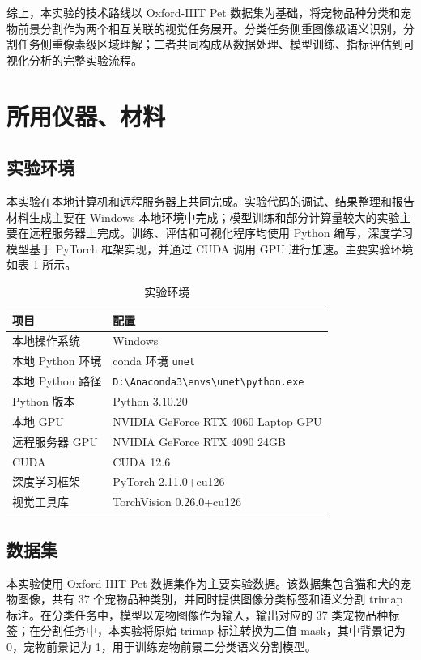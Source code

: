 \documentclass[UTF8,a4paper,12pt]{ctexart}
\begin{document}
综上，本实验的技术路线以 Oxford-IIIT Pet 数据集为基础，将宠物品种分类和宠物前景分割作为两个相互关联的视觉任务展开。分类任务侧重图像级语义识别，分割任务侧重像素级区域理解；二者共同构成从数据处理、模型训练、指标评估到可视化分析的完整实验流程。

\section{所用仪器、材料}

\subsection{实验环境}

本实验在本地计算机和远程服务器上共同完成。实验代码的调试、结果整理和报告材料生成主要在 Windows 本地环境中完成；模型训练和部分计算量较大的实验主要在远程服务器上完成。训练、评估和可视化程序均使用 Python 编写，深度学习模型基于 PyTorch 框架实现，并通过 CUDA 调用 GPU 进行加速。主要实验环境如表 \ref{tab:environment} 所示。

\begin{table}[H]
\centering
\caption{实验环境}
\label{tab:environment}
\begin{tabular}{p{}p{}}
\toprule
项目 & 配置 \\
\midrule
本地操作系统 & Windows \\
本地 Python 环境 & conda 环境 \texttt{unet} \\
本地 Python 路径 & \texttt{D:\textbackslash Anaconda3\textbackslash envs\textbackslash unet\textbackslash python.exe} \\
Python 版本 & Python 3.10.20 \\
本地 GPU & NVIDIA GeForce RTX 4060 Laptop GPU \\
远程服务器 GPU & NVIDIA GeForce RTX 4090 24GB \\
CUDA & CUDA 12.6 \\
深度学习框架 & PyTorch 2.11.0+cu126 \\
视觉工具库 & TorchVision 0.26.0+cu126 \\
\bottomrule
\end{tabular}
\end{table}

\subsection{数据集}

本实验使用 Oxford-IIIT Pet 数据集作为主要实验数据。该数据集包含猫和犬的宠物图像，共有 37 个宠物品种类别，并同时提供图像分类标签和语义分割 trimap 标注。在分类任务中，模型以宠物图像作为输入，输出对应的 37 类宠物品种标签；在分割任务中，本实验将原始 trimap 标注转换为二值 mask，其中背景记为 0，宠物前景记为 1，用于训练宠物前景二分类语义分割模型。
\end{document}
